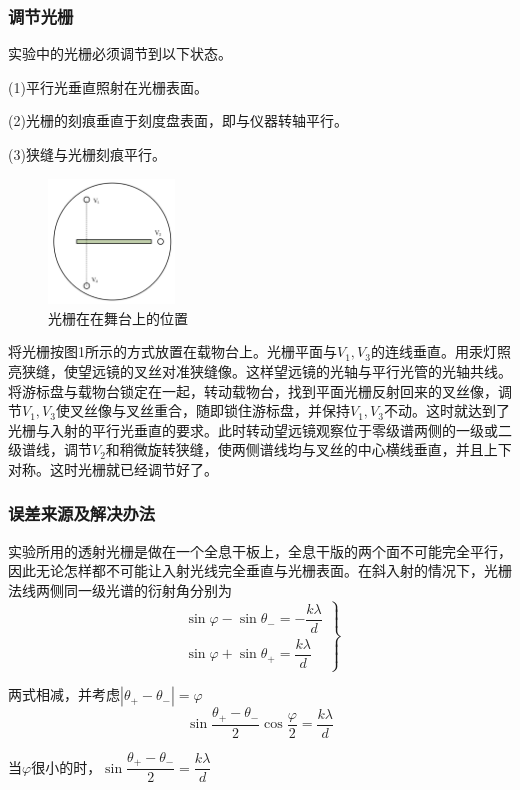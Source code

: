 \documentclass[12pt,a4paper,UTF8]{ctexart}
\begin{document}
\subsubsection*{调节光栅}
\par 实验中的光栅必须调节到以下状态。
\par (1)平行光垂直照射在光栅表面。
\par (2)光栅的刻痕垂直于刻度盘表面，即与仪器转轴平行。
\par (3)狭缝与光栅刻痕平行。
\begin{figure}[!htbp]
	\centering
	\includegraphics[width=0.3\textwidth]{光栅位置}
	\caption{光栅在在舞台上的位置}
\end{figure}
\clearpage
将光栅按图1所示的方式放置在载物台上。光栅平面与$V_1,V_3$的连线垂直。用汞灯照亮狭缝，使望远镜的叉丝对准狭缝像。这样望远镜的光轴与平行光管的光轴共线。将游标盘与载物台锁定在一起，转动载物台，找到平面光栅反射回来的叉丝像，调节$V_1,V_3$使叉丝像与叉丝重合，随即锁住游标盘，并保持$V_1,V_3$不动。这时就达到了光栅与入射的平行光垂直的要求。此时转动望远镜观察位于零级谱两侧的一级或二级谱线，调节$V_2$和稍微旋转狭缝，使两侧谱线均与叉丝的中心横线垂直，并且上下对称。这时光栅就已经调节好了。
\subsubsection*{误差来源及解决办法}
\par 实验所用的透射光栅是做在一个全息干板上，全息干版的两个面不可能完全平行，因此无论怎样都不可能让入射光线完全垂直与光栅表面。在斜入射的情况下，光栅法线两侧同一级光谱的衍射角分别为
$$
\left.\begin{array}{l}
	\sin \varphi-\sin \theta_{-}=-\dfrac{k \lambda}{d} \\
	\sin \varphi+\sin \theta_{+}=\dfrac{k \lambda}{d}
\end{array}\right\}
$$
\par 两式相减，并考虑$|\theta_{+}-\theta_{-}|=\varphi$
\[\sin{\frac{\theta_{+}-\theta_{-}}{2}}\cos{\frac{\varphi}{2}}=\frac{k \lambda}{d}\]
\par 当$\varphi$很小的时，$\sin{\dfrac{\theta_{+}-\theta_{-}}{2}}=\dfrac{k \lambda}{d}$
\end{document}
